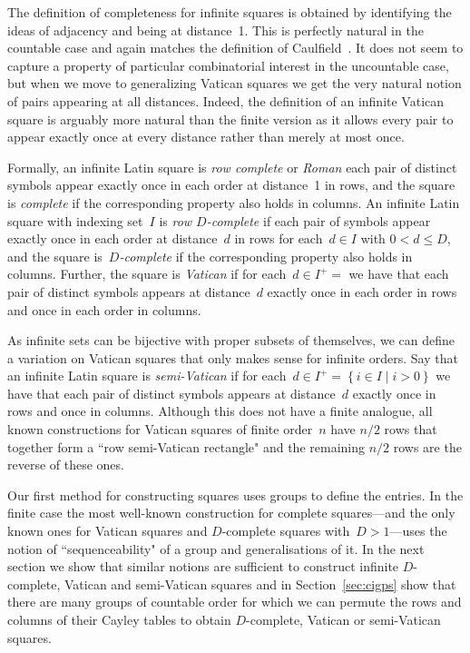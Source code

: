 \documentclass[12pt,a4paper]{article}
\newcommand{\st}{\; | \;}
\newcommand{\set}[2]{\left\{#1\st #2 \right\}}
\begin{document}
The definition of completeness for infinite squares is obtained by identifying the ideas of adjacency and being at distance~1.  This is perfectly natural in the countable case and again matches the definition of Caulfield~\cite{Caulfield96}.   It does not seem to capture a property of particular combinatorial interest in the uncountable case, but when we move to generalizing Vatican squares we get the very natural notion of pairs appearing at  all distances.  Indeed, the definition of an infinite Vatican square is arguably more natural than the finite version as it allows every pair to appear exactly once  at every distance rather than merely at most once.

Formally, an infinite Latin square is {\em row complete} or {\em Roman} each pair of distinct symbols appear exactly once in each order at distance~1 in rows, and the square is {\em complete} if the corresponding property also holds in columns.   An infinite Latin square with indexing set~$I$ is {\em row $D$-complete} if each pair of symbols appear exactly once in each order at distance~$d$ in rows for each~$d \in I$ with $0 < d \leq D$, and the square is~{\em $D$-complete} if the corresponding property also holds in columns. Further, the square is {\em Vatican} if for each~$d \in I^+=$ we have that each pair of distinct symbols appears at distance~$d$ exactly once in each order in rows and once in each order in columns.

As infinite sets can be bijective with proper subsets of themselves, we can define a variation on Vatican squares that only makes sense for infinite orders.
Say that an infinite Latin square is {\em semi-Vatican} if for each~$d \in I^+=\set{i \in I}{i>0}$ we have that each pair of distinct symbols appears at distance~$d$ exactly once in rows and once in columns.  Although this does not have a finite analogue, all known constructions for Vatican squares of finite order~$n$ have $n/2$ rows that together form a ``row semi-Vatican rectangle" and the remaining $n/2$ rows are the reverse of these ones.

Our first method for constructing squares uses groups to define the entries.   In the finite case the most well-known construction for complete squares---and the only known ones for Vatican squares and $D$-complete squares with~$D>1$---uses the notion of ``sequenceability" of a group and generalisations of it.  In the next section we show that similar notions are sufficient to construct infinite $D$-complete, Vatican and semi-Vatican squares and in Section~\ref{sec:cigps} show that there are many groups of countable order for which we can permute the rows and columns of their Cayley tables to obtain $D$-complete, Vatican or semi-Vatican squares.
\end{document}
